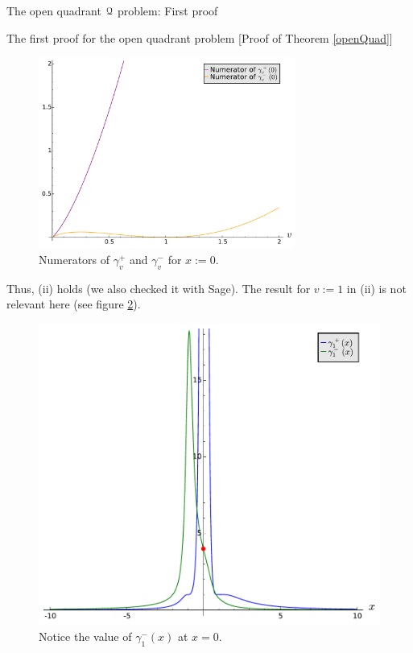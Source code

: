 \documentclass[11pt, a4paper, english, twoside, notitlepage, openright]{report}
\begin{document}
\begin{chapter}{The open quadrant $\mathcal{Q}$ problem: First proof}
\begin{section}{The first proof for the open quadrant problem} [Proof of Theorem \ref{openQuad}]
\begin{figure}[h]
\centering
\includegraphics[width=0.75\textwidth]{plots/ch1_08_numerators.pdf}
\caption{Numerators of $\gamma_v^+$ and $\gamma_v^-$ for $x:=0$.\label{fig:numerators}}
\end{figure}
			
Thus, (ii) holds (we also checked it with Sage). The result for $v:=1$ in (ii) is not relevant here (see figure \ref{fig:limit}).
\begin{figure}[h]
\centering
\includegraphics[width=1\textwidth]{plots/ch1_09_limit.pdf}
\caption{Notice the value of $\gamma_1^-(x)$ at $x=0$.\label{fig:limit}}
\end{figure}


\end{section}
\end{chapter}
\end{document}
